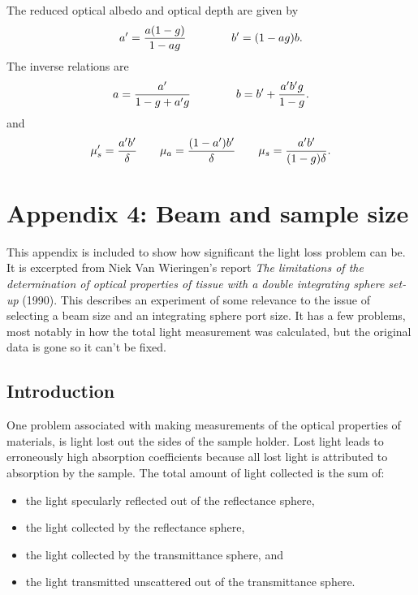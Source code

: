 \documentclass{article}
\begin{document}
The reduced optical albedo and optical depth are given by
$$
a' = {a(1-g)  \over 1 - ag} \qquad \qquad b'=(1 - ag)b.
$$
The inverse relations are
$$
a = {a'\over 1-g+a'g} \qquad \qquad b = b'+ {a'b'g\over1-g}.
$$
and
$$
\mu_s' = {a'b'     \over \delta} \qquad
\mu_a  = {(1-a')b' \over \delta} \qquad
\mu_s  = {a'b'     \over (1-g)\delta}.
$$


\clearpage
\section*{Appendix 4: Beam and sample size}

This appendix is included to show how significant the light loss problem can 
be.  It is excerpted from Niek Van Wieringen's report {\it The limitations of the
determination of optical properties of tissue with a double integrating sphere
set-up} (1990).  This describes an experiment of some relevance to the issue of
selecting a beam size and an integrating sphere port size.  It has a few
problems, most notably in how the total light measurement was calculated, but
the original data is gone so it can't be fixed.

\subsection*{Introduction}

One problem associated with making measurements of the optical properties of
materials, is light lost out the sides of the sample holder.  Lost light
leads to erroneously high absorption coefficients because all
lost light is attributed to absorption by the sample.  
The total amount of light collected is the sum of:
\begin{itemize}
\item
the light specularly reflected out of the reflectance sphere,
\item
the light collected by the reflectance sphere,
\item
the light collected by the transmittance sphere, and
\item
the light transmitted unscattered out of the transmittance sphere.
\end{itemize}
\end{document}
